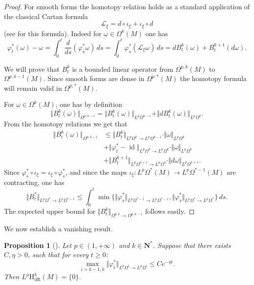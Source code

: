 \documentclass[JEP,XML,SOM,Unicode,published]{cedram}
\newcommand{\dR}{\mathrm{dR}}
\newcommand{\rH}{\mathrm{H}}
\newcommand{\NN}{\mathbf{N}}
\theoremstyle{plain}
\newtheorem{proposition}[equation]{Proposition}
\theoremstyle{remark}
\theoremstyle{definition}
\DeclareMathOperator{\id}{id}
\begin{document}
\begin{proof} For smooth forms the homotopy relation holds as a standard application of the classical Cartan formula
\[\mathcal L_\xi = d \circ \iota_\xi + \iota_\xi \circ d\] (see \eg \cite[Prop.\,1.121]{GHL} for this formula). Indeed for $\omega \in \Omega^k(M)$
one has
\[\varphi_t^* (\omega) - \omega = \int_0^t \frac{d}{ds}(\varphi_s^* \omega)\,ds = \int_0^t \varphi_s^* (\mathcal L_\xi \omega) \,ds
= dB_t^k (\omega) + B_t^{k+1}(d\omega).\]

We will prove that $B_t^k$ is a bounded linear operator from $\Omega^{p,k}(M)$ to $\Omega^{p, k-1}(M)$. Since smooth forms are dense in
$\Omega^{p, *}(M)$
the homotopy formula will remain valid in $\Omega^{p, *}(M)$.

For $\omega \in \Omega^k (M)$, one has by definition
\[\Vert B_t^k (\omega) \Vert_{\Omega^{p, k-1}} =
\Vert B_t^k (\omega) \Vert_{L^p \Omega^{k-1}} +
\Vert d B_t^k (\omega) \Vert_{L^p \Omega^k}.\]
From the homotopy relations we get that
\begin{align*}
\Vert B_t^k (\omega) \Vert_{\Omega^{p, k-1}}&
\leqslant \Vert B_t^k \Vert_{L^p \Omega^k \to L^p \Omega^{k-1}} \cdot \Vert \omega \Vert_{L^p \Omega^k} \\
&+ \Vert \varphi_t^* - \id \Vert_{L^p \Omega^k \to L^p \Omega^k} \cdot \Vert \omega \Vert_{L^p \Omega^k}\\
&+ \Vert B_t^{k+1} \Vert_{L^p \Omega^{k+1} \to L^p \Omega^k} \cdot \Vert d \omega \Vert_{L^p \Omega^{k+1}}.
\end{align*}
Since $\varphi_s^* \circ \iota_\xi = \iota_\xi \circ \varphi_s^*$,
and since the maps $\iota_\xi: L^p \Omega^* (M) \to L^p \Omega^{*-1} (M)$ are contracting, one has
\[\Vert B_t^* \Vert_{L^p \Omega^* \to L^p \Omega^{*-1}} \leqslant
\int_0^t \min \{\Vert \varphi_s^* \Vert_{L^p \Omega^{*-1} \to L^p \Omega^{*-1}} , \Vert \varphi_s^* \Vert_{L^p \Omega^* \to L^p \Omega^*}\}\,ds.\]
The expected upper bound for $\Vert B_t^k \Vert_{\Omega^{p,k} \to \Omega^{p,k-1}}$ follows easily.
\end{proof}

We now establish a vanishing result.

\begin{proposition}[{\cite[Prop.\,10]{P1}}]\label{vanishing-proposition}
Let $p \in (1, +\infty)$ and $k \in \NN^*$. Suppose that there exists $C, \eta >0$, such that for every $t\geqslant 0$:
\[\max_{i = k-1, k} \Vert \varphi_t^* \Vert_{L^p \Omega^i \to L^p \Omega^i} \leqslant C e^{-\eta t}.\]
Then $L^p \rH_\dR^k (M) = \{0\}$.
\end{proposition}
\end{document}
